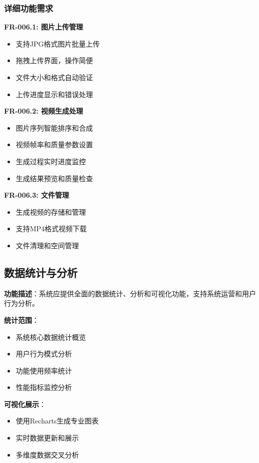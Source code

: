 \documentclass[12pt,a4paper]{article}
\begin{document}
\subsubsection{详细功能需求}

\textbf{FR-006.1: 图片上传管理}
\begin{itemize}
    \item 支持JPG格式图片批量上传
    \item 拖拽上传界面，操作简便
    \item 文件大小和格式自动验证
    \item 上传进度显示和错误处理
\end{itemize}

\textbf{FR-006.2: 视频生成处理}
\begin{itemize}
    \item 图片序列智能排序和合成
    \item 视频帧率和质量参数设置
    \item 生成过程实时进度监控
    \item 生成结果预览和质量检查
\end{itemize}

\textbf{FR-006.3: 文件管理}
\begin{itemize}
    \item 生成视频的存储和管理
    \item 支持MP4格式视频下载
    \item 文件清理和空间管理
\end{itemize}

\subsection{数据统计与分析}

\begin{reqbox}[title={FR-007: 数据统计分析}]
\textbf{功能描述}：系统应提供全面的数据统计、分析和可视化功能，支持系统运营和用户行为分析。

\textbf{统计范围}：
\begin{itemize}[nosep]
    \item 系统核心数据统计概览
    \item 用户行为模式分析
    \item 功能使用频率统计
    \item 性能指标监控分析
\end{itemize}

\textbf{可视化展示}：
\begin{itemize}[nosep]
    \item 使用Recharts生成专业图表
    \item 实时数据更新和展示
    \item 多维度数据交叉分析
\end{itemize}
\end{reqbox}
\end{document}

